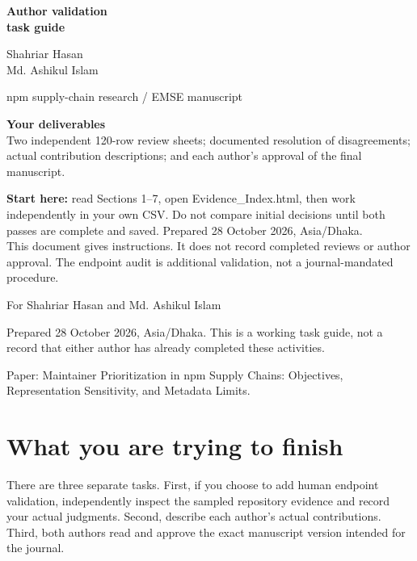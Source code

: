 \documentclass[11pt,a4paper]{article}
\begin{document}
\begin{titlepage}
\vspace*{12mm}
{\color{taskblue}\Huge\bfseries Author validation\\[4pt]task guide\par}
\vspace{8mm}
{\Large Shahriar Hasan\\Md. Ashikul Islam\par}
\vspace{10mm}
{\large npm supply-chain research / EMSE manuscript\par}
\vspace{10mm}
\colorbox{taskpale}{\parbox{0.94\linewidth}{\textbf{Your deliverables}\\Two independent 120-row review sheets; documented resolution of disagreements; actual contribution descriptions; and each author's approval of the final manuscript.}}
\par
\vspace{8mm}
\textbf{Start here:} read Sections 1--7, open Evidence\_Index.html, then work independently in your own CSV. Do not compare initial decisions until both passes are complete and saved.
\vfill
Prepared 28 October 2026, Asia/Dhaka.\\
This document gives instructions. It does not record completed reviews or author approval. The endpoint audit is additional validation, not a journal-mandated procedure.
\end{titlepage}
\tableofcontents
\clearpage


For Shahriar Hasan and Md. Ashikul Islam


Prepared 28 October 2026, Asia/Dhaka. This is a working task guide, not a record that either author has already completed these activities.


Paper: Maintainer Prioritization in npm Supply Chains: Objectives, Representation Sensitivity, and Metadata Limits.


\section{What you are trying to finish}


There are three separate tasks. First, if you choose to add human endpoint validation, independently inspect the sampled repository evidence and record your actual judgments. Second, describe each author's actual contributions. Third, both authors read and approve the exact manuscript version intended for the journal.
\end{document}
